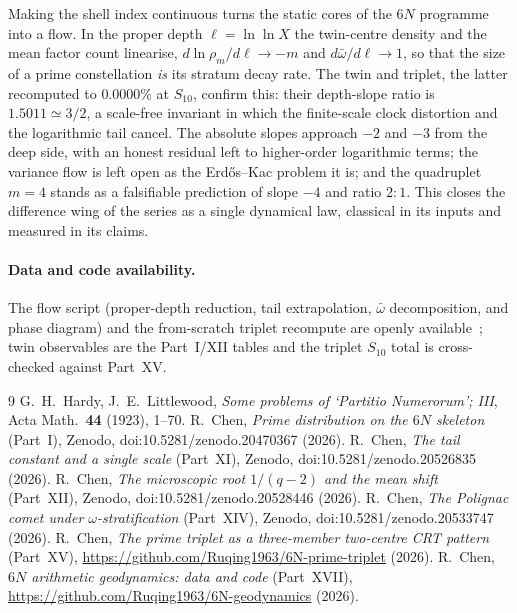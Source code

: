 \documentclass[11pt]{article}
\begin{document}
Making the shell index continuous turns the static cores of the $6N$ programme
into a flow. In the proper depth $\ell=\ln\ln X$ the twin-centre density and the
mean factor count linearise, $d\ln\rho_m/d\ell\to-m$ and $d\bar\omega/d\ell\to1$,
so that the size of a prime constellation \emph{is} its stratum decay rate. The
twin and triplet, the latter recomputed to $0.0000\%$ at $S_{10}$, confirm this:
their depth-slope ratio is $1.5011\simeq3/2$, a scale-free invariant in which the
finite-scale clock distortion and the logarithmic tail cancel. The absolute
slopes approach $-2$ and $-3$ from the deep side, with an honest residual left to
higher-order logarithmic terms; the variance flow is left open as the
Erd\H{o}s--Kac problem it is; and the quadruplet $m=4$ stands as a falsifiable
prediction of slope $-4$ and ratio $2{:}1$. This closes the difference wing of the
series as a single dynamical law, classical in its inputs and measured in its
claims.

\paragraph{Data and code availability.}
The flow script (proper-depth reduction, tail extrapolation, $\bar\omega$
decomposition, and phase diagram) and the from-scratch triplet recompute are
openly available~\cite{repo}; twin observables are the Part~I/XII tables and the
triplet $S_{10}$ total is cross-checked against Part~XV.

\begin{thebibliography}{9}
 G.~H.~Hardy, J.~E.~Littlewood, \emph{Some problems of `Partitio
Numerorum'; III}, Acta Math.\ \textbf{44} (1923), 1--70.
 R.~Chen, \emph{Prime distribution on the $6N$ skeleton} (Part~I),
Zenodo, doi:10.5281/zenodo.20470367 (2026).
 R.~Chen, \emph{The tail constant and a single scale} (Part~XI),
Zenodo, doi:10.5281/zenodo.20526835 (2026).
 R.~Chen, \emph{The microscopic root $1/(q-2)$ and the mean
shift} (Part~XII), Zenodo, doi:10.5281/zenodo.20528446 (2026).
 R.~Chen, \emph{The Polignac comet under $\omega$-stratification}
(Part~XIV), Zenodo, doi:10.5281/zenodo.20533747 (2026).
 R.~Chen, \emph{The prime triplet as a three-member two-centre
CRT pattern} (Part~XV),
\url{https://github.com/Ruqing1963/6N-prime-triplet} (2026).
 R.~Chen, \emph{$6N$ arithmetic geodynamics: data and code}
(Part~XVII), \url{https://github.com/Ruqing1963/6N-geodynamics} (2026).
\end{thebibliography}
\end{document}
